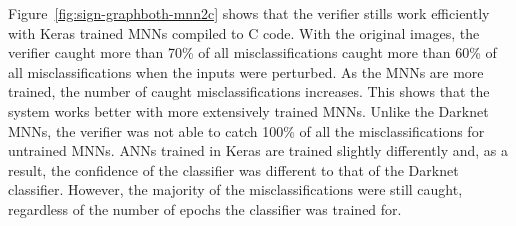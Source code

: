 Figure~\ref{fig:sign-graphboth-mnn2c} shows that the verifier stills work efficiently with Keras trained \acp{MNN} compiled to C code.
With the original images, the verifier caught more than 70\% of all misclassifications caught more than 60\% of all misclassifications when the inputs were perturbed.
As the \acp{MNN} are more trained, the number of caught misclassifications increases.
This shows that the system works better with more extensively trained \acp{MNN}.
Unlike the Darknet \acp{MNN}, the verifier was not able to catch 100\% of all the misclassifications for untrained \acp{MNN}.
\acp{ANN} trained in Keras are trained slightly differently and, as a result, the confidence of the classifier was different to that of the Darknet classifier.
However, the majority of the misclassifications were still caught, regardless of the number of epochs the classifier was trained for.





















